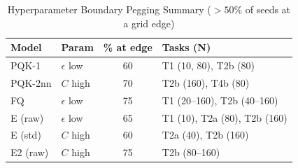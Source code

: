 \begin{table}[!t]
\caption{Hyperparameter Boundary Pegging Summary ($>50\%$ of seeds at a grid edge)}
\label{tab:grid_boundaries}
\centering
\begingroup
\footnotesize
\setlength{\tabcolsep}{3.5pt}
\begin{tabular}{@{}llcl@{}}
\toprule
\textbf{Model} & \textbf{Param} & \textbf{\% at edge} & \textbf{Tasks (N)} \\
\midrule
PQK-1   & $\epsilon$ low & 60 & T1 (10, 80), T2b (80) \\
PQK-2nn & $C$ high       & 70 & T2b (160), T4b (80) \\
FQ      & $\epsilon$ low & 75 & T1 (20--160), T2b (40--160) \\
E (raw) & $\epsilon$ low & 65 & T1 (10), T2a (80), T2b (160) \\
E (std) & $C$ high       & 60 & T2a (40), T2b (160) \\
E2 (raw)& $C$ high       & 75 & T2b (80--160) \\
\bottomrule
\end{tabular}
\endgroup
\end{table}
